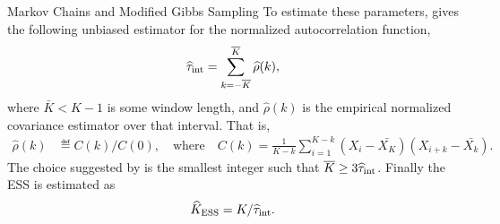 \begin{chapter}{Markov Chains and Modified Gibbs Sampling}
To estimate these parameters, \citep{sokal1997monte} gives the following unbiased estimator for the normalized autocorrelation function,
\begin{equation}
  \hat\tau_{\rm int}=\sum_{k=-\bar K}^{\bar K} \hat{\rho}(k),
\end{equation}
where $\bar K< K-1$ is some window length, and $\hat \rho(k)$ is the empirical normalized covariance estimator over that interval.
That is,
\begin{align}
\hat\rho(k)&\eqdef C(k)/C(0), \quad\text{where}\quad
C(k)=\frac{1}{K-k}\sum_{i=1}^{K-k} (X_i-\bar{X_K})(X_{i+k}-\bar{X_k}).
\end{align}
The choice suggested by \cite{sokal1997monte} is the smallest integer such that $\bar K\geq 3 \hat\tau_{\rm int}$. 
Finally the ESS is estimated as
\begin{equation}
\label{ESS}
\hat{K}_{\rm ESS}=K/\hat\tau_{\rm int}.
\end{equation}

\end{chapter}


